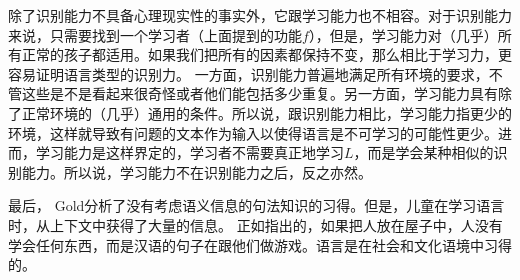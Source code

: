 除了识别能力不具备心理现实性的事实外，它跟学习能力也不相容\citep[]{Johnson2004a}。对于识别能力来说，只需要找到一个学习者（上面提到的功能$f$），但是，学习能力对（几乎）所有正常的孩子都适用。如果我们把所有的因素都保持不变，那么相比于学习力，更容易证明语言类型的识别力。
一方面，识别能力普遍地满足所有环境的要求，不管这些是不是看起来很奇怪或者他们能包括多少重复。另一方面，学习能力具有除了正常环境的（几乎）通用的条件。所以说，跟识别能力相比，学习能力指更少的环境，这样就导致有问题的文本作为输入以使得语言是不可学习的可能性更少。进而，学习能力是这样界定的，学习者不需要真正地学习$L$，而是学会某种相似的识别能力。所以说，学习能力不在识别能力之后，反之亦然。

最后， Gold分析了没有考虑语义信息的句法知识的习得。但是，儿童在学习语言时，从上下文中获得了大量的信息\citep{TCCBM2005a}。 正如\citet[]{Klein86a-u}指出的，如果把人放在屋子中，人没有学会任何东西，而是汉语的句子在跟他们做游戏。语言是在社会和文化语境中习得的。
 
